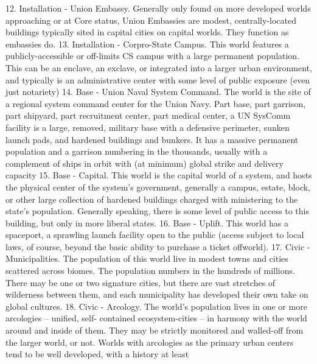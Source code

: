      12. Installation - Union Embassy. Generally only found on more developed worlds  
         approaching or at Core status, Union Embassies are modest, centrally-located buildings  
         typically sited in capital cities on capital worlds. They function as embassies do.   
     13. Installation - Corpro-State Campus. This world features a publicly-accessible or off-limits  
         CS campus with a large permanent population. This can be an enclave, an exclave, or  
         integrated into a larger urban environment, and typically is an administrative center with  
         some level of public exposure (even just notariety)   
     14. Base - Union Naval System Command. The world is the site of a regional system  
         command center for the Union Navy. Part base, part garrison, part shipyard, part  
         recruitment center, part medical center, a UN SysComm facility is a large, removed,  
         military base with a defensive perimeter, sunken launch pads, and hardened buildings and  
         bunkers. It has a massive permanent population and a garrison numbering in the  
         thousands, usually with a complement of ships in orbit with (at minimum) global strike and  
         delivery capacity  
     15. Base - Capital. This world is the capital world of a system, and hosts the physical center of  
         the system’s government, generally a campus, estate, block, or other large collection of  
         hardened buildings charged with ministering to the state’s population. Generally speaking,  
         there is some level of public access to this building, but only in more liberal states.   
     16. Base - Uplift. This world has a spaceport, a sprawling launch facility open to the public  
         (access subject to local laws, of course, beyond the basic ability to purchase a ticket  
         offworld).    
     17. Civic - Municipalities. The population of this world live in modest towns and cities scattered  
         across biomes. The population numbers in the hundreds of millions. There may be one or  
         two signature cities, but there are vast stretches of wilderness between them, and each  
         municipality has developed their own take on global cultures.    
     18. Civic - Arcology. The world’s population lives in one or more arcologies -- unified, self- 
         contained ecosystem-cities -- in harmony with the world around and inside of them. They  
         may be strictly monitored and walled-off from the larger world, or not. Worlds with  
         arcologies as the primary urban centers tend to be well developed, with a history at least  
